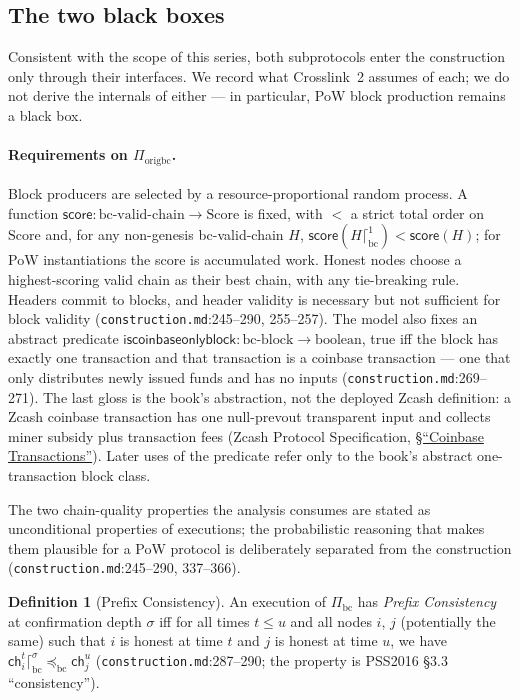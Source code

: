\documentclass[11pt,a4paper]{article}
\theoremstyle{definition}
\newtheorem{definition}[theorem]{Definition}
\begin{document}
\subsection{The two black boxes}\label{sec:xl-blackboxes}

Consistent with the scope of this series, both subprotocols enter the
construction only through their interfaces. We record what Crosslink~2
assumes of each; we do not derive the internals of either --- in
particular, PoW block production remains a black box.

\paragraph{Requirements on $\Pi_{\mathrm{origbc}}$.} Block producers are
selected by a resource-proportional random process. A function
$\mathsf{score} : \text{bc-valid-chain} \to \mathrm{Score}$ is fixed, with
$<$ a strict total order on $\mathrm{Score}$ and, for any non-genesis
bc-valid-chain $H$, $\mathsf{score}(H \lceil^{1}_{\mathrm{bc}}) <
\mathsf{score}(H)$; for PoW instantiations the score is accumulated work.
Honest nodes choose a highest-scoring valid chain as their best chain,
with any tie-breaking rule. Headers commit to blocks, and header validity
is necessary but not sufficient for block validity
(\texttt{construction.md}:245--290, 255--257). The model also fixes an
abstract
predicate $\mathsf{iscoinbaseonlyblock} : \text{bc-block} \to
\mathrm{boolean}$, true iff the block has exactly one transaction and that
transaction is a coinbase transaction --- one that only distributes newly
issued funds and has no inputs (\texttt{construction.md}:269--271). The
last gloss is the book's abstraction, not the deployed Zcash definition:
a Zcash coinbase transaction has one null-prevout transparent input and
collects miner subsidy plus transaction fees (Zcash Protocol Specification,
\href{https://zips.z.cash/protocol/protocol.pdf\#coinbasetransactions}{\S``Coinbase Transactions''}). Later uses of the predicate refer only to the
book's abstract one-transaction block class.

The two chain-quality properties the analysis consumes are stated as
unconditional properties of executions; the probabilistic reasoning that
makes them plausible for a PoW protocol is deliberately separated from the
construction (\texttt{construction.md}:245--290, 337--366).

\begin{definition}[Prefix Consistency]\label{def:xl-prefix-consistency}
An execution of $\Pi_{\mathrm{bc}}$ has \emph{Prefix Consistency} at
confirmation depth $\sigma$ iff for all times $t \le u$ and all nodes $i$,
$j$ (potentially the same) such that $i$ is honest at time $t$ and $j$ is
honest at time $u$, we have $\mathsf{ch}_i^t \lceil^{\sigma}_{\mathrm{bc}}
\preceq_{\mathrm{bc}} \mathsf{ch}_j^u$ (\texttt{construction.md}:287--290;
the property is PSS2016 \S3.3 ``consistency'').
\end{definition}
\end{document}
